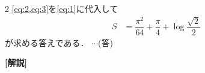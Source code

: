\documentclass[../../main.tex]{subfiles}
\begin{document}
\begin{multicols}{2}
  \cref{eq:2,eq:3}を\cref{eq:1}に代入して
  \begin{align}
    S & = \dfrac{\pi^2}{64} + \dfrac{\pi}{4} + \log\dfrac{\sqrt{2}}{2}
  \end{align}
  が求める答えである．  $\cdots$(答)

  {\bf [解説]}
  \newpage
\end{multicols}
\end{document}
